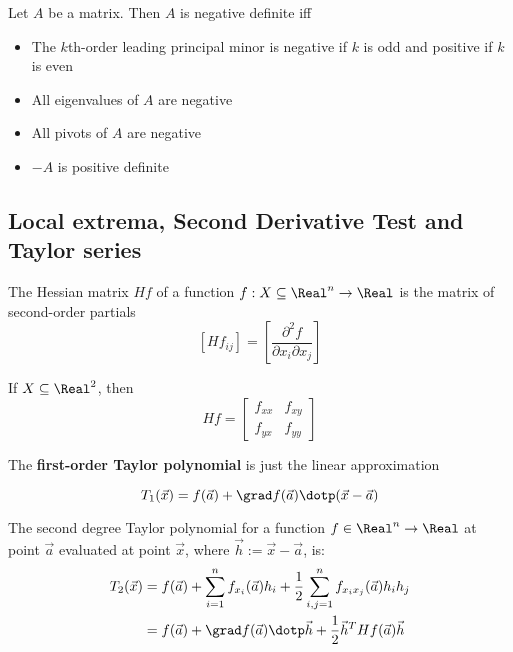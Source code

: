 \begin{theorem}
  Let $A$ be a matrix. Then $A$ is negative definite iff
  \begin{itemize}
    \item The $k$th-order leading principal minor is negative if $k$ is odd and positive if $k$ is even
    \item All eigenvalues of $A$ are negative
    \item All pivots of $A$ are negative
    \item $-A$ is positive definite
  \end{itemize}
\end{theorem}

\subsection{Local extrema, Second Derivative Test and Taylor series}


\begin{definition}
  The Hessian matrix $Hf$ of a function $f : X \subseteq \Real^n \to \Real$ is the matrix of second-order partials
  \[
    \left[Hf_{ij}\right] = \left[\frac{\partial^2 f}{\partial x_i \partial x_j}\right]
  \]

  If $X \subseteq \Real^2$, then
  \[
    Hf = \begin{bmatrix}
      f_{xx} & f_{xy} \\
      f_{yx} & f_{yy}
    \end{bmatrix}
  \]
\end{definition}

The \textbf{first-order Taylor polynomial} is just the linear approximation

\[
  T_1(\vec{x}) = f(\vec{a}) + \grad f(\vec{a}) \dotp (\vec{x} - \vec{a})
\]

\begin{definition}
  The second degree Taylor polynomial for a function $f \in \Real^n \to \Real$ at point $\vec{a}$ evaluated at point $\vec{x}$, where $\vec{h} := \vec{x} - \vec{a}$, is:
  \begin{align*}
    T_2(\vec{x}) &= f(\vec{a}) + \sum_{i = 1}^n f_{x_i}(\vec{a}) h_i + \frac{1}{2} \sum_{i,j=1}^n f_{x_i x_j}(\vec{a}) h_i h_j \\
    &= f(\vec{a}) + \grad f(\vec{a}) \dotp \vec{h} + \frac{1}{2} \vec{h}^T Hf(\vec{a}) \vec{h}
  \end{align*}
\end{definition}

